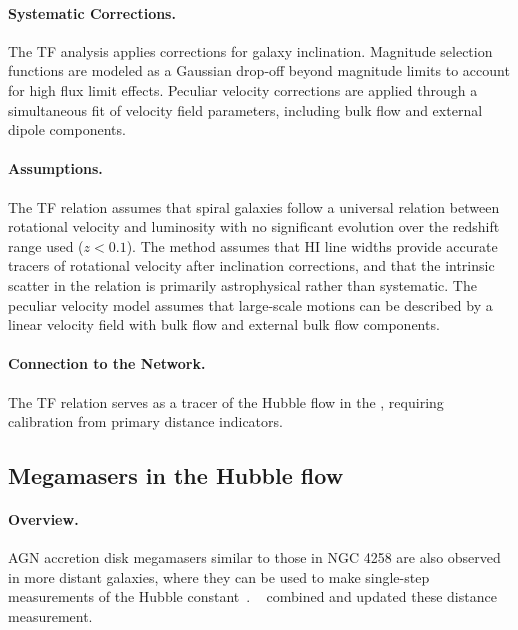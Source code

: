\paragraph{Systematic Corrections.}
The TF analysis applies corrections for galaxy inclination. Magnitude selection functions are modeled as a Gaussian drop-off beyond magnitude limits to account for high flux limit effects. Peculiar velocity corrections are applied through a simultaneous fit of velocity field parameters, including bulk flow and external dipole components. 

\paragraph{Assumptions.}
The TF relation assumes that spiral galaxies follow a universal relation between rotational velocity and luminosity with no significant evolution over the redshift range used ($z<0.1$). The method assumes that HI line widths provide accurate tracers of rotational velocity after inclination corrections, and that the intrinsic scatter in the relation is primarily astrophysical rather than systematic. The peculiar velocity model assumes that large-scale motions can be described by a linear velocity field with bulk flow and external bulk flow components. 

\paragraph{Connection to the Network.}
The TF relation serves as a tracer of the Hubble flow in the {\DN}, requiring calibration from primary distance indicators.

\subsection{Megamasers in the Hubble flow}

\paragraph{Overview.}
AGN accretion disk megamasers similar to those in NGC 4258 are also observed in more distant galaxies, where they can be used to make single-step measurements of the Hubble constant~\citep{2007IAUS..242..399B}. ~\citet{2020ApJ...891L...1P} combined and updated these distance measurement.

